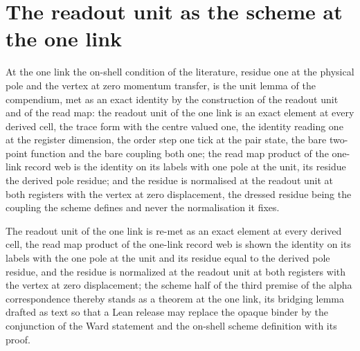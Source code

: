 \section{The readout unit as the scheme at the one link}\label{mod:I-2-D535412-olus-t1}
\begin{chtheorem}\label{box:I-2-D535412-olus-t1:1}
At the one link the on-shell condition of the literature, residue one at the physical pole and the vertex at zero momentum transfer, is the unit lemma of the compendium, met as an exact identity by the construction of the readout unit and of the read map: the readout unit of the one link is an exact element at every derived cell, the trace form with the centre valued one, the identity reading one at the register dimension, the order step one tick at the pair state, the bare two-point function and the bare coupling both one; the read map product of the one-link record web is the identity on its labels with one pole at the unit, its residue the derived pole residue; and the residue is normalised at the readout unit at both registers with the vertex at zero displacement, the dressed residue being the coupling the scheme defines and never the normalisation it fixes.
\end{chtheorem}
The readout unit of the one link is re-met as an exact element at every derived cell, the read map product of the one-link record web is shown the identity on its labels with the one pole at the unit and its residue equal to the derived pole residue, and the residue is normalized at the readout unit at both registers with the vertex at zero displacement; the scheme half of the third premise of the alpha correspondence thereby stands as a theorem at the one link, its bridging lemma drafted as text so that a Lean release may replace the opaque binder by the conjunction of the Ward statement and the on-shell scheme definition with its proof.

